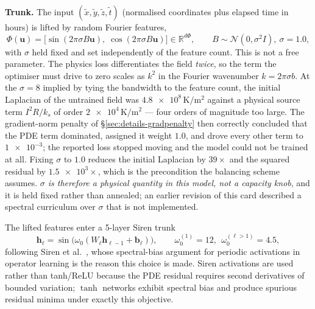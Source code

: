 \documentclass[journal,10pt,compsoc,onecolumn]{IEEEtran}
\begin{document}
\noindent
\textbf{Trunk.} The input $(\tilde{x},\tilde{y},\tilde{z},\tilde{t})$
(normalised coordinates plus elapsed time in hours) is lifted by
random Fourier features,
\begin{equation}
 \Phi(\mathbf{u}) = \bigl[\sin(2\pi\sigma B\mathbf{u}),\;
                        \cos(2\pi\sigma B\mathbf{u})\bigr]\in\mathbb{R}^{d\Phi},
 \qquad B\sim\mathcal{N}(0,\sigma^2 I), \ \sigma=\num{1.0},
\label{eq:fourier}
\end{equation}
with $\sigma$ held fixed and set independently of the feature count. This is not
a free parameter. The physics loss differentiates the field \emph{twice}, so the
term the optimiser must drive to zero scales as $k^2$ in the Fourier wavenumber
$k=2\pi\sigma b$. At the $\sigma=\num{8}$ implied by tying the bandwidth to the
feature count, the initial Laplacian of the untrained field was
$\num{4.8e8}\,\si{\kelvin\per\metre\squared}$ against a physical source term
$I^2R/k_s$ of order $\num{2e4}\,\si{\kelvin\per\metre\squared}$ --- four orders
of magnitude too large. The gradient-norm penalty of \S\ref{sec:details-gradpenalty}
then correctly concluded that the PDE term dominated, assigned it weight
$\num{1.0}$, and drove every other term to $\num{1e-3}$; the reported loss
stopped moving and the model could not be trained at all. Fixing $\sigma$ to
$\num{1.0}$ reduces the initial Laplacian by $\num{39}\times$ and the squared
residual by $\num{1.5e3}\times$, which is the precondition the balancing scheme
assumes. \emph{$\sigma$ is therefore a physical quantity in this model, not a
capacity knob}, and it is held fixed rather than annealed; an earlier revision
of this card described a spectral curriculum over $\sigma$ that is not
implemented.

The lifted features enter a \num{5}-layer Siren trunk
\begin{equation}
 \mathbf{h}_\ell = \sin\bigl(\omega_0(W_\ell \mathbf{h}_{\ell-1}+\mathbf{b}_\ell)\bigr),
 \qquad \omega_0^{(1)}=12,\ \ \omega_0^{(\ell>1)}=4.5 ,
\label{eq:siren}
\end{equation}
following Siren et al.~\cite{siren2020}, whose spectral-bias argument for
periodic activations in operator learning is the reason this choice is made.
Siren activations are used rather than
tanh/ReLU because the PDE residual requires second derivatives of bounded
variation; $\tanh$ networks exhibit spectral bias and produce spurious residual
minima under exactly this objective.
\end{document}
